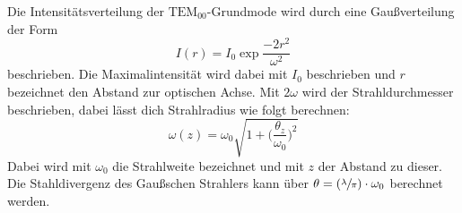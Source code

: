 Die Intensitätsverteilung der $\text{TEM}_{00}$-Grundmode wird durch eine Gaußverteilung der Form
\begin{equation}
  I(r)=I_0\exp{\frac{-2r^2}{\omega^2}}
\end{equation}
beschrieben. Die Maximalintensität wird dabei mit $I_0$ beschrieben und $r$ bezeichnet den Abstand
zur optischen Achse. Mit $2\omega$ wird der Strahldurchmesser beschrieben, dabei lässt dich Strahlradius
wie folgt berechnen:
\begin{equation}
  \omega(z)=\omega_0\sqrt{1+\Big(\frac{\theta_z}{\omega_0}\Big)^2}
  \label{eqn:Strahlradius}
\end{equation}
Dabei wird mit $\omega_0$ die Strahlweite bezeichnet und mit $z$ der Abstand zu dieser.
Die Stahldivergenz des Gaußschen Strahlers kann über $\theta=(\sfrac{\lambda}{\pi})\cdot\omega_0$ berechnet werden.
